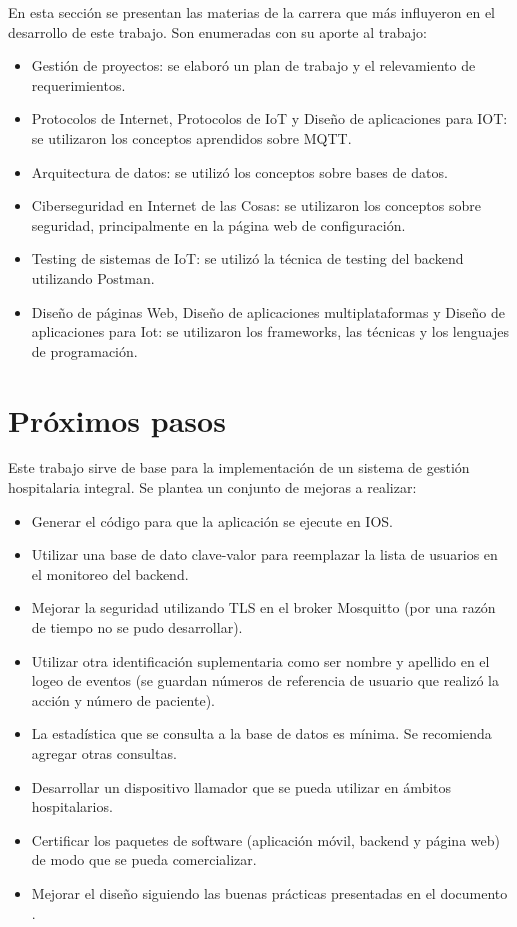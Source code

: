 En esta sección se presentan las materias de la carrera que más influyeron en el desarrollo de este trabajo. Son enumeradas con su aporte al trabajo:

\begin{itemize}
\item Gestión de proyectos: se elaboró un plan de trabajo y el relevamiento de requerimientos.
\item Protocolos de Internet, Protocolos de IoT y Diseño de aplicaciones para IOT: se utilizaron los conceptos aprendidos sobre MQTT.
\item Arquitectura de datos: se utilizó los conceptos sobre bases de datos.
\item Ciberseguridad en Internet de las Cosas: se utilizaron los conceptos sobre seguridad, principalmente en la página web de configuración.
\item Testing de sistemas de IoT: se utilizó la técnica de testing del backend utilizando Postman.
\item Diseño de páginas Web, Diseño de aplicaciones multiplataformas y Diseño de aplicaciones para Iot: se utilizaron los frameworks, las técnicas y los lenguajes de programación.
\end{itemize}

\section{Próximos pasos}


Este trabajo sirve de base para la implementación de un sistema de gestión hospitalaria integral. Se plantea un conjunto de mejoras a realizar:

\begin{itemize}
\item Generar el código para que la aplicación se ejecute en IOS.
\item Utilizar una base de dato clave-valor para reemplazar la lista de usuarios en el monitoreo del backend.
\item Mejorar la seguridad utilizando TLS en el broker Mosquitto (por una razón de tiempo no se pudo desarrollar).
\item Utilizar otra identificación suplementaria como ser nombre y apellido en el logeo de eventos (se guardan números de referencia de usuario que realizó la acción y número de paciente). 
\item La estadística que se consulta a la base de datos es mínima. Se recomienda agregar otras consultas.
\item Desarrollar un dispositivo llamador que se pueda utilizar en ámbitos hospitalarios.
\item Certificar los paquetes de software (aplicación móvil, backend y página web) de modo que se pueda comercializar.
\item Mejorar el diseño siguiendo las buenas prácticas presentadas en el documento \citep{BOOK:3}.

\end{itemize}
